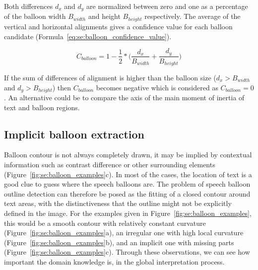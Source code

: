 Both differences $d_x$ and $d_y$ are normalized between zero and one as a percentage of the balloon width $B_{width}$ and height $B_{height}$ respectively.
The average of the vertical and horizontal alignments gives a confidence value for each balloon candidate (Formula~\ref{eq:se:balloon_confidence_value}).


\begin{equation}
	\label{eq:se:balloon_confidence_value}
	C_{balloon} = 1 - \frac{1}{2} *  \bigg( \frac{d_x}{B_{width}} + \frac{d_y}{B_{height}} \bigg)
\end{equation}

If the sum of differences of alignment is higher than the balloon size ($d_x > B_{width}$ and $d_y > B_{height}$) then $C_{balloon}$ becomes negative which is considered as $C_{balloon}=0$.
An alternative could be to compare the axis of the main moment of inertia of text and balloon regions.






\subsection{Implicit balloon extraction} %
\label{sub:se:implicit_balloon_extraction}

Balloon contour is not always completely drawn, it may be implied by contextual information such as contrast difference or other surrounding elements (Figure~\ref{fig:se:balloon_examples}c).
In most of the cases, the location of text is a good clue to guess where the speech balloons are.
The problem of speech balloon outline detection can therefore be posed as the fitting of a closed contour around text areas, with the distinctiveness that the outline might not be explicitly defined in the image.
For the examples given in Figure~\ref{fig:se:balloon_examples}, this would be a smooth contour with relatively constant curvature (Figure~\ref{fig:se:balloon_examples}a), an irregular one with high local curvature (Figure~\ref{fig:se:balloon_examples}b), and an implicit one with missing parts (Figure~\ref{fig:se:balloon_examples}c).
Through these observations, we can see how important the domain knowledge is, in the global interpretation process.

